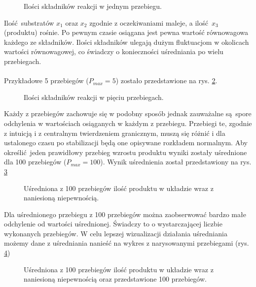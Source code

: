 \documentclass[a4paper,12pt]{article}
\begin{document}
\begin{figure}[H]
	\centering
	
	\caption{Ilości składników reakcji w jednym przebiegu.}
	\label{fig:first_run}
\end{figure}

\noaka Ilość substratów $x_1$ oraz $x_2$ zgodnie z oczekiwaniami maleje, a ilość $x_3$ (produktu) rośnie. Po pewnym czasie osiągana jest pewna wartość równowagowa każdego ze składników. Ilości składników ulegają dużym fluktuacjom w okolicach wartości równowagowej, co świadczy o konieczności uśredniania po wielu przebiegach. 
\\
\\
Przykładowe 5 przebiegów ($P_{max} = 5$) zostało przedstawione na rys. \ref{fig:five_runs}.
\begin{figure}[H]
	\centering
	
	\caption{Ilości składników reakcji w pięciu przebiegach.}
	\label{fig:five_runs}
\end{figure}

\noaka Każdy z przebiegów zachowuje się w podobny sposób jednak zauważalne są spore odchylenia w wartościach osiąganych w każdym z przebiegu.
Przebiegi te, zgodnie z intuicją i z centralnym twierdzeniem granicznym, muszą się różnić i dla ustalonego czasu po stabilizacji będą one opisywane rozkładem normalnym.
Aby określić jeden prawidłowy przebieg wzrostu produktu wyniki zostały uśrednione dla 100 przebiegów ($P_{max} = 100$). Wynik uśrednienia został przedstawiony na rys. \ref{fig:avg_run_100}
\begin{figure}[H]
	\centering
	
	\caption{Uśredniona z 100 przebiegów ilość produktu w układzie wraz z naniesioną niepewnością.}
	\label{fig:avg_run_100}
\end{figure} 

\noaka Dla uśrednionego przebiegu z 100 przebiegów można zaobserwować bardzo małe odchylenie od wartości uśrednionej. 
Świadczy to o wystarczającej liczbie wykonanych przebiegów. 
W celu lepszej wizualizacji działania uśredniania możemy dane z uśredniania nanieść na wykres z narysowanymi przebiegami (rys. \ref{fig:add1})
\begin{figure}[H]
	\centering
	
	\caption{Uśredniona z 100 przebiegów ilość produktu w układzie wraz z naniesioną niepewnością oraz przedstawione 100 przebiegów.}
	\label{fig:add1}
\end{figure} 
\end{document}
